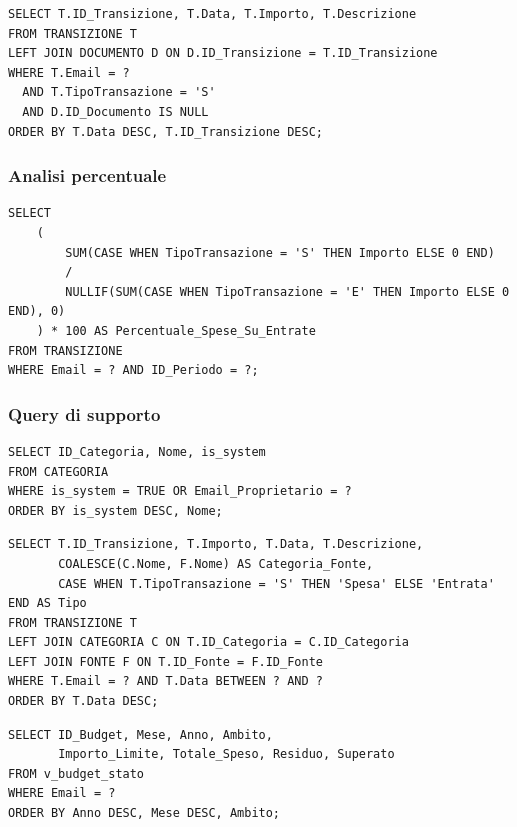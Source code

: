 \documentclass[11pt,a4paper]{article}
\begin{document}
\begin{lstlisting}[caption={Spese dell'utente ancora prive di documento}]
SELECT T.ID_Transizione, T.Data, T.Importo, T.Descrizione
FROM TRANSIZIONE T
LEFT JOIN DOCUMENTO D ON D.ID_Transizione = T.ID_Transizione
WHERE T.Email = ?
  AND T.TipoTransazione = 'S'
  AND D.ID_Documento IS NULL
ORDER BY T.Data DESC, T.ID_Transizione DESC;
\end{lstlisting}

\subsubsection{Analisi percentuale}
\begin{lstlisting}[caption={Rapporto spese/entrate mensile}]
SELECT
    (
        SUM(CASE WHEN TipoTransazione = 'S' THEN Importo ELSE 0 END)
        /
        NULLIF(SUM(CASE WHEN TipoTransazione = 'E' THEN Importo ELSE 0 END), 0)
    ) * 100 AS Percentuale_Spese_Su_Entrate
FROM TRANSIZIONE
WHERE Email = ? AND ID_Periodo = ?;
\end{lstlisting}

\subsubsection{Query di supporto}
\begin{lstlisting}[caption={Categorie disponibili per utente}]
SELECT ID_Categoria, Nome, is_system
FROM CATEGORIA
WHERE is_system = TRUE OR Email_Proprietario = ?
ORDER BY is_system DESC, Nome;
\end{lstlisting}

\begin{lstlisting}[caption={Riepilogo transazioni per periodo}]
SELECT T.ID_Transizione, T.Importo, T.Data, T.Descrizione,
       COALESCE(C.Nome, F.Nome) AS Categoria_Fonte,
       CASE WHEN T.TipoTransazione = 'S' THEN 'Spesa' ELSE 'Entrata' END AS Tipo
FROM TRANSIZIONE T
LEFT JOIN CATEGORIA C ON T.ID_Categoria = C.ID_Categoria
LEFT JOIN FONTE F ON T.ID_Fonte = F.ID_Fonte
WHERE T.Email = ? AND T.Data BETWEEN ? AND ?
ORDER BY T.Data DESC;
\end{lstlisting}

\begin{lstlisting}[caption={Budget con residuo e stato di superamento}]
SELECT ID_Budget, Mese, Anno, Ambito,
       Importo_Limite, Totale_Speso, Residuo, Superato
FROM v_budget_stato
WHERE Email = ?
ORDER BY Anno DESC, Mese DESC, Ambito;
\end{lstlisting}
\end{document}
